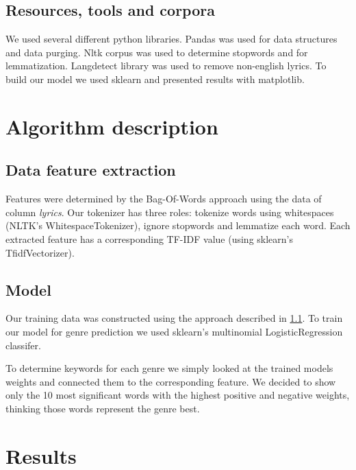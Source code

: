 \documentclass[a4paper,11pt]{article}
\begin{document}
\subsection{Resources, tools and corpora}

We used several different python libraries. Pandas was used for data structures and data purging. Nltk corpus was used to determine stopwords and for lemmatization. Langdetect library was used to remove non-english lyrics. To build our model we used sklearn and presented results with matplotlib.

\section{Algorithm description}


\subsection{Data feature extraction}
\label{feature-extraction}
Features were determined by the Bag-Of-Words approach using the data of column \textit{lyrics}.
Our tokenizer has three roles: tokenize words using whitespaces (NLTK's WhitespaceTokenizer), ignore stopwords and lemmatize each word.
Each extracted feature has a corresponding TF-IDF value (using sklearn's TfidfVectorizer).

\subsection{Model}
Our training data was constructed using the approach described in \ref{feature-extraction}.
To train our model for genre prediction we used sklearn's multinomial LogisticRegression classifer. 

To determine keywords for each genre we simply looked at the trained models weights and connected them to the corresponding feature.
We decided to show only the 10 most significant words with the highest positive and negative weights, thinking those words represent the genre best.

\section{Results}
\end{document}
